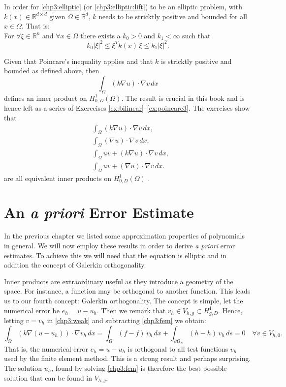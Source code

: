 In order for \eqref{chp3:elliptic} (or \eqref{chp3:elliptic:lift}) to be an elliptic problem, with  $k(x) \in \mathbb{R}^{d\times d}$ given $\Omega\in \mathbb{R}^d$,  
$k$ needs to be stricktly positive and bounded for all $x\in \Omega$. That is: \\  
For $\forall \xi\in \mathbb{R}^n$ and $\forall x \in \Omega$ there exists a $k_0 > 0$ and $k_1 < \infty$ such that 
\[
	k_0 |\xi|^2  \le    \xi^T k(x) \, \xi \le k_1 |\xi|^2 .   
\]

Given that Poincare's inequality applies and that $k$ is stricktly positive and bounded as defined above, then 
\[
\int_\Omega (k \nabla u) \cdot \nabla v \, dx 
\]
defines an inner product
on $H^1_{0, D} (\Omega)$. 
The result is crucial in this book and is hence left as a series of Exerceises \ref{ex:bilinear}--\ref{ex:poincare3}.  
The exercises show that
\begin{align}
	&\int_\Omega (k \nabla u) \cdot \nabla v \, dx,  \\  
	&\int_\Omega (\nabla u) \cdot \nabla v \, dx,  \\ 
	&\int_\Omega u v + (k \nabla u) \cdot \nabla v \, dx,  \\ 
	&\int_\Omega u v + ( \nabla u) \cdot \nabla v \, dx .  
\end{align}
are all equivalent inner products on $H^1_{0, D}(\Omega)$ . 

\section{An \emph{a priori} Error Estimate}

In the previous chapter we listed some approximation properties of polynomials in general. We will now employ these results in order to
derive \emph{a priori} error estimates. To achieve this we will need that the equation is elliptic and in addition 
the concept of Galerkin orthogonality. 


Inner products are extraordinary useful as they introduce a geometry of the space. For instance, 
a function may be orthogonal to another function. This leads us to our fourth concept: 
Galerkin orthogonality. The concept is simple, let the numerical error be $e_h = u - u_h$. Then we
remark that $v_h \in V_{h,g} \subset H^1_{g, D}$. Hence, letting 
$v=v_h$ in \eqref{chp3:weak} and subtracting \eqref{chp3:fem} we obtain:   
\begin{equation}
\label{chp3:orth}
	\int_\Omega (k \nabla (u -  u_h)) \cdot \nabla v_h \, dx = \int_\Omega (f -f) \, v_h \, dx + \int_{\partial \Omega_N} (h -h)  \, v_h \, ds = 0 \quad    \forall v\in  V_{h, 0} .  
\end{equation}
That is, the numerical error $e_h = u - u_h$ is orthogonal to all test functions $v_h$ used by the finite element method. This is a strong result and
perhaps surprising. The solution $u_h$, found by solving \eqref{chp3:fem} is therefore the best possible solution that can be found in $V_{h, g}$.   

